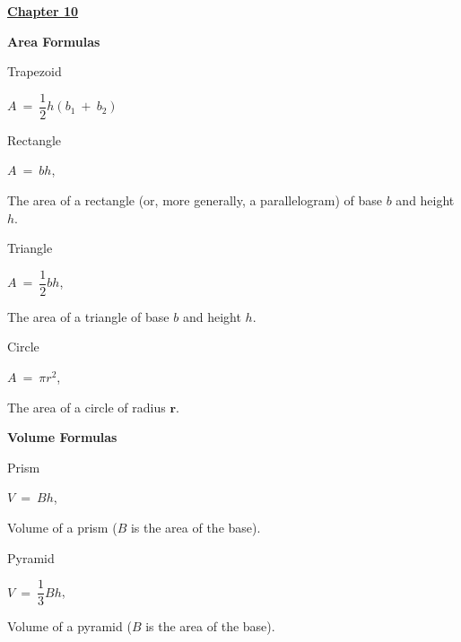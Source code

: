 \documentclass{article}
\begin{document}
\begin{large}
\underline{\textbf{\huge Chapter 10 \phantom{ } \phantom{ } \phantom{ } \phantom{ }}}

\textbf{Area Formulas}

\hspace{0.1in} Trapezoid

\hspace{2.5in} $A\ =\ \dfrac{1}{2}h(b_{1}\ +\ b_{2})$

\hspace{0.1in} Rectangle

\hspace{0.1in} $A\ =\ bh$,\hspace{0.2in} \begin{large}The area of a rectangle (or, more generally, a parallelogram) of base $b$ and height $h$.\end{large}

\hspace{0.1in} Triangle

\hspace{1.5in} $A\ =\ \dfrac{1}{2}bh$,\hspace{0.2in} \begin{large}The area of a triangle of base $b$ and height $h$.\end{large}

\hspace{0.1in} Circle

\hspace{1.5in} $A\ =\ \pi r^{2}$,\hspace{0.2in} \begin{large}The area of a circle of radius $\textbf{r}$.\end{large}

\textbf{Volume Formulas}

\hspace{0.1in} Prism

\hspace{1.5in} $V\ =\ Bh$,\hspace{0.2in} \begin{large}Volume of a prism ($B$ is the area of the base).\end{large}

\hspace{0.1in} Pyramid

\hspace{1.5in} $V\ =\ \dfrac{1}{3}Bh$,\hspace{0.2in} \begin{large}Volume of a pyramid ($B$ is the area of the base).\end{large}


\end{large}
\end{document}
